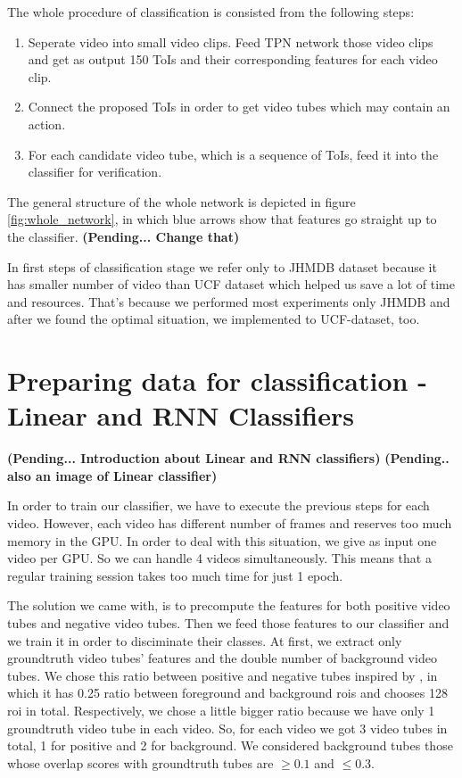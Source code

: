 \documentclass{report}
\begin{document}
The whole procedure of classification is consisted from the following steps:
\begin{enumerate}
\item Seperate video into small video clips. Feed TPN network those video clips and get as output
  150 ToIs and their corresponding features for each video clip.
\item Connect the proposed ToIs in order to get video tubes which may contain an action.
\item For each candidate video tube, which is a sequence of ToIs, feed it into the classifier
  for verification.
\end{enumerate}

The general structure of the whole network is depicted in figure \ref{fig:whole_network}, in which blue arrows show that
features go straight up to the classifier. \textbf{(Pending... Change that)} \par
In first steps of classification stage we refer only to JHMDB dataset because it has smaller number of video than UCF dataset which
helped us save a lot of time and resources. That's because  we performed most experiments only JHMDB and after we found the optimal
situation, we implemented to UCF-dataset, too. 

\section{Preparing data for classification - Linear and RNN Classifiers}

\textbf{(Pending... Introduction about Linear and RNN classifiers)}
\textbf{(Pending.. also an image of Linear classifier)}

In order to train our classifier, we have to execute the previous steps for each video. However, each video
has different number of frames and reserves too much memory in the GPU. In order to deal with this situation,
we give as input one video per GPU. So we can handle 4 videos simultaneously. This means that a regular
training session takes too much time for just 1 epoch. \par
The solution we came with, is to precompute the features for both positive video tubes and negative video tubes.
Then we feed those features to our classifier and we train it in order to disciminate their classes.
At first, we extract only groundtruth video tubes' features and the double number of background video tubes. We chose this
ratio between positive and negative tubes inspired by \cite{jjfaster2rcnn}, in which it has 0.25 ratio between foreground
and background rois and chooses 128 roi in total. Respectively, we chose a little bigger ratio because we have only 1 groundtruth
video tube in each video. So, for each video we got 3 video tubes in total, 1 for positive and 2 for background. We considered
background tubes those whose overlap scores with groundtruth tubes are $ \ge 0.1 $ and $ \le 0.3 $. \par
\end{document}
